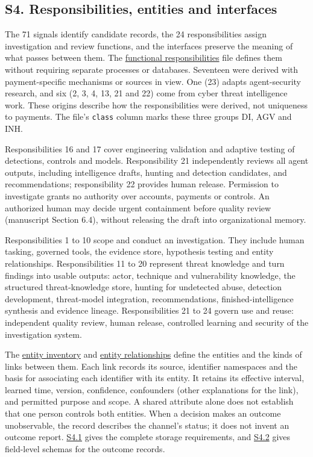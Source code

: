 \documentclass[
  11pt,
]{article}
\begin{document}
\FloatBarrier

\hypertarget{s4.-responsibilities-entities-and-interfaces}{%
\subsection{S4. Responsibilities, entities and
interfaces}\label{s4.-responsibilities-entities-and-interfaces}}

\suppressfloats[t]

The 71 signals identify candidate records, the 24 responsibilities
assign investigation and review functions, and the interfaces preserve
the meaning of what passes between them. The
\href{SUPPLEMENT/S4_FUNCTIONS.csv}{functional responsibilities} file
defines them without requiring separate processes or databases.
Seventeen were derived with payment-specific mechanisms or sources in
view. One (23) adapts agent-security research, and six (2, 3, 4, 13, 21
and 22) come from cyber threat intelligence work. These origins describe
how the responsibilities were derived, not uniqueness to payments. The
file's \texttt{class} column marks these three groups DI, AGV and INH.

Responsibilities 16 and 17 cover engineering validation and adaptive
testing of detections, controls and models. Responsibility 21
independently reviews all agent outputs, including intelligence drafts,
hunting and detection candidates, and recommendations; responsibility 22
provides human release. Permission to investigate grants no authority
over accounts, payments or controls. An authorized human may decide
urgent containment before quality review (manuscript Section 6.4),
without releasing the draft into organizational memory.

Responsibilities 1 to 10 scope and conduct an investigation. They
include human tasking, governed tools, the evidence store, hypothesis
testing and entity relationships. Responsibilities 11 to 20 represent
threat knowledge and turn findings into usable outputs: actor, technique
and vulnerability knowledge, the structured threat-knowledge store,
hunting for undetected abuse, detection development, threat-model
integration, recommendations, finished-intelligence synthesis and
evidence lineage. Responsibilities 21 to 24 govern use and reuse:
independent quality review, human release, controlled learning and
security of the investigation system.

The \href{SUPPLEMENT/S4_ENTITIES.csv}{entity inventory} and
\href{SUPPLEMENT/S4_ENTITY_RELATIONS.csv}{entity relationships} define
the entities and the kinds of links between them. Each link records its
source, identifier namespaces and the basis for associating each
identifier with its entity. It retains its effective interval, learned
time, version, confidence, confounders (other explanations for the
link), and permitted purpose and scope. A shared attribute alone does
not establish that one person controls both entities. When a decision
makes an outcome unobservable, the record describes the channel's
status; it does not invent an outcome report.
\protect\hyperlink{s41-complete-storage-requirements}{S4.1} gives the
complete storage requirements, and
\protect\hyperlink{s42-field-level-schemas-for-outcome-records}{S4.2}
gives field-level schemas for the outcome records.
\end{document}
